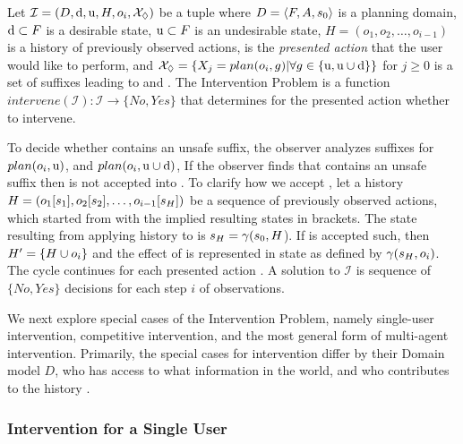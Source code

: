 \sloppy
\begin{definition}
  \label{def:standard}
  Let $\mathcal{I} = (D, \mathrm{d}, \mathrm{u}, H, o_i, \mathcal{X}_\Diamond)$ be a tuple where
  $D=\langle F, A, s_0 \rangle$ is a planning domain,
  $\mathrm{d} \subset F$ is a desirable state,
  $\mathrm{u} \subset F$ is an undesirable state,
  $H = (o_1, o_2, \ldots, o_{i-1})$ is a history of previously observed actions,
  \presentedAction is the \emph{presented action} that the user would like to perform, and
  $\mathcal{X}_\Diamond = \{ X_j = plan( o_i, g) | \forall g \in \{\mathrm{u}, \mathrm{u}\cup\mathrm{d}\} \}$ for $j \geq 0$ is a set of suffixes leading to \undesired and \dandu.
The \textnormal{Intervention Problem} is a function $intervene (\mathcal{I}) :  \mathcal{I} \rightarrow \{No, Yes\} $
that determines for the presented action \presentedAction whether to intervene.
\end{definition}
\noindent
To decide whether \Suffixes contains an unsafe suffix, the observer analyzes suffixes for 
   $plan(o_i, \mathrm{u})$, and
   $plan(o_i, \mathrm{u}\cup\mathrm{d})$,  
If the observer finds that \Suffixes contains an unsafe suffix then \presentedAction is not accepted into \historyDef.
To clarify how we accept \presentedAction,  let a history  $H = ( o_1 [s_1], o_2 [s_2], \ldots, o_{i-1} [s_{H}])$  be a sequence of previously observed actions, which started from \initialState with the implied resulting states in brackets.
The state resulting from applying history to \initialState is $s_{H} = \gamma(s_0, H$).
If \presentedAction is accepted such, then  $H'=\lbrace H\cup o_i\rbrace$ and the effect of \presentedAction is represented in state as defined by $\gamma(s_{H}, o_i)$.
The cycle continues for each presented action \presentedAction.
A solution to $\mathcal{I}$  is sequence of $\{No, Yes \}$ decisions for each step $i$ of observations.

We next explore special cases of the Intervention Problem, namely single-user intervention, competitive intervention, and the most general form of multi-agent intervention.
Primarily, the special cases for intervention differ by their Domain model $D$, who has access to what information in the world, and who contributes to the history \historyDef.


\subsubsection{Intervention for a Single User}

